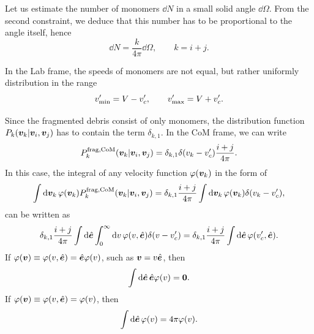 \documentclass[aps,prl,preprint,groupedaddress,10pt]{revtex4-2}
\begin{document}
Let us estimate the number of monomers $\dd{N}$ in a small solid angle $\dd{\Omega}$.
From the second constraint, we deduce that this number has to be proportional to the
angle itself, hence
\begin{equation}
    \dd{N}=\frac{k}{4\pi}\dd{\Omega},\qquad k=i+j.
\end{equation}

In the Lab frame, the speeds of monomers are not equal, but rather uniformly
distribution in the range
\begin{equation}
    v'_{\mathrm{min}}=V-v'_c,\qquad v'_{\mathrm{max}}=V+v'_c.
\end{equation}

Since the fragmented debris consist of only monomers, the distribution function
$P_k\pqty{\bv_k\vert\bv_i,\bv_j}$ has to contain the term $\delta_{k,1}$.
In the CoM frame, we can write
\begin{equation}
    \utx{P_k}{frag, CoM}\pqty{\bv_k\vert\bv_i,\bv_j}=
    \delta_{k,1}\delta\pqty{v_k-v'_c}\frac{i+j}{4\pi}.
\end{equation}
In this case, the integral of any velocity function $\varphi\pqty{\bv_k}$ in the form of
\begin{equation}
    \int\dd{\bv_k}\varphi\pqty{\bv_k}\utx{P_k}{frag,CoM}\pqty{\bv_k\vert\bv_i,\bv_j}=
    \delta_{k,1}\frac{i+j}{4\pi}\int\dd{\bv_k}\varphi\pqty{\bv_k}\delta\pqty{v_k-v'_c},
\end{equation}
can be written as
\begin{equation}
    \delta_{k,1}\frac{i+j}{4\pi}\int\dd{\be}
    \int_{0}^{\infty}\dd{v}\varphi\pqty{v,\be}\delta\pqty{v-v'_c}=
    \delta_{k,1}\frac{i+j}{4\pi}\int\dd{\be}\varphi\pqty{v'_c,\be}.
\end{equation}
If $\varphi\pqty{\bv}\equiv\varphi\pqty{v,\be}=\be\varphi\pqty{v}$, such as $\vb*{v}=v\hat{\vb*{e}}$,
then
\begin{equation}
    \int\dd{\be}\be\varphi\pqty{v}=\bnull.
\end{equation}
If $\varphi\pqty{\bv}\equiv\varphi\pqty{v,\be}=\varphi\pqty{v}$, then
\begin{equation}
    \int\dd{\be}\varphi\pqty{v}=4\pi\varphi\pqty{v}.
\end{equation}
\end{document}

